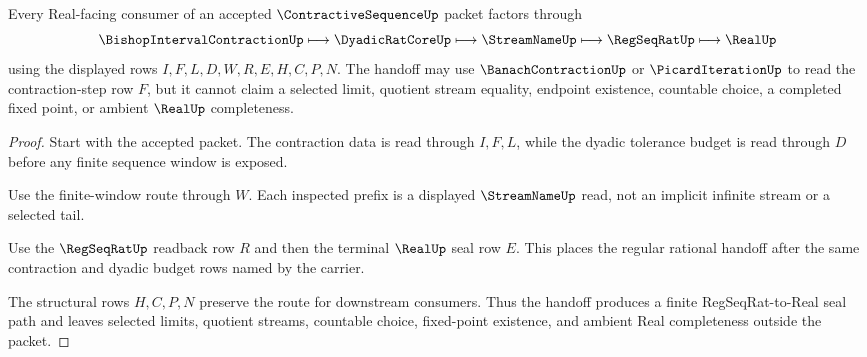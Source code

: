 \begin{theorem}
\label{thm:contractive-sequence-regseqrat-handoff}
Every Real-facing consumer of an accepted $\ContractiveSequenceUp$ packet factors through
$$
\BishopIntervalContractionUp \longmapsto \DyadicRatCoreUp \longmapsto \StreamNameUp \longmapsto \RegSeqRatUp \longmapsto \RealUp
$$
using the displayed rows $I,F,L,D,W,R,E,H,C,P,N$. The handoff may use $\BanachContractionUp$ or $\PicardIterationUp$ to read the contraction-step row $F$, but it cannot claim a selected limit, quotient stream equality, endpoint existence, countable choice, a completed fixed point, or ambient $\RealUp$ completeness.
\end{theorem}
\begin{proof}
Start with the accepted packet. The contraction data is read through $I,F,L$, while the dyadic tolerance budget is read through $D$ before any finite sequence window is exposed.

Use the finite-window route through $W$. Each inspected prefix is a displayed $\StreamNameUp$ read, not an implicit infinite stream or a selected tail.

Use the $\RegSeqRatUp$ readback row $R$ and then the terminal $\RealUp$ seal row $E$. This places the regular rational handoff after the same contraction and dyadic budget rows named by the carrier.

The structural rows $H,C,P,N$ preserve the route for downstream consumers. Thus the handoff produces a finite RegSeqRat-to-Real seal path and leaves selected limits, quotient streams, countable choice, fixed-point existence, and ambient Real completeness outside the packet.
\end{proof}




